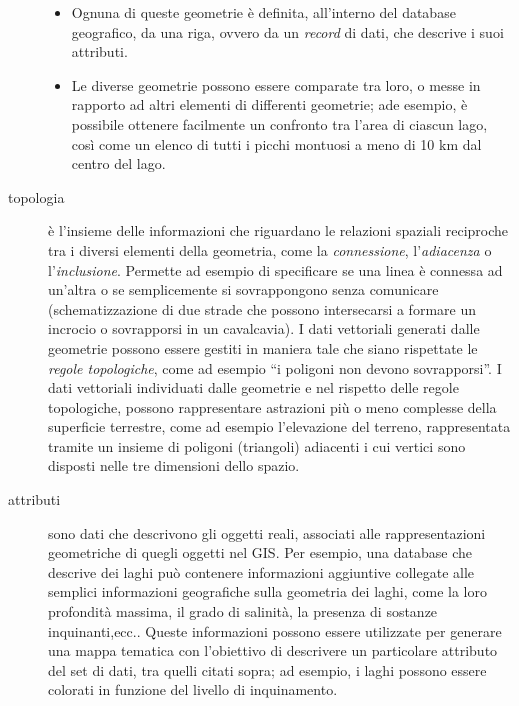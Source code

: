 \begin{description}
			\begin{itemize}
				\item Ognuna di queste geometrie è definita, all'interno del database geografico, da una riga, ovvero da un \emph{record} di dati, che descrive i suoi attributi.
				\item Le diverse geometrie possono essere comparate tra loro, o messe in rapporto ad altri elementi di differenti geometrie; ade esempio, è possibile ottenere facilmente un confronto tra l'area di ciascun lago, così come un elenco di tutti i picchi montuosi a meno di 10 km dal centro del lago.
			\end{itemize}

		\item [{topologia}] è l'insieme delle informazioni che riguardano le relazioni spaziali reciproche tra i diversi elementi della geometria, come la \emph{connessione}, l'\emph{adiacenza} o l'\emph{inclusione}. Permette ad esempio di specificare se una linea è connessa ad un'altra o se semplicemente si sovrappongono senza comunicare (schematizzazione di due strade che possono intersecarsi a formare un incrocio o sovrapporsi in un cavalcavia). I dati vettoriali generati dalle geometrie possono essere gestiti in maniera tale che siano rispettate le \emph{regole topologiche}, come ad esempio ``i poligoni non devono sovrapporsi''. I dati vettoriali individuati dalle geometrie e nel rispetto delle regole topologiche, possono rappresentare astrazioni più o meno complesse della superficie terrestre, come ad esempio l'elevazione del terreno, rappresentata tramite un insieme di poligoni (triangoli) adiacenti i cui vertici sono disposti nelle tre dimensioni dello spazio.
		
		\item [{attributi}] sono dati che descrivono gli oggetti reali, associati alle rappresentazioni geometriche di quegli oggetti nel GIS. Per esempio, una database che descrive dei laghi può contenere informazioni aggiuntive collegate alle semplici informazioni geografiche sulla geometria dei laghi, come la loro profondità massima, il grado di salinità, la presenza di sostanze inquinanti,ecc.. Queste informazioni possono essere utilizzate per generare una mappa tematica con l'obiettivo di descrivere un particolare attributo del set di dati, tra quelli citati sopra; ad esempio, i laghi possono essere colorati in funzione del livello di inquinamento.

	\end{description}

